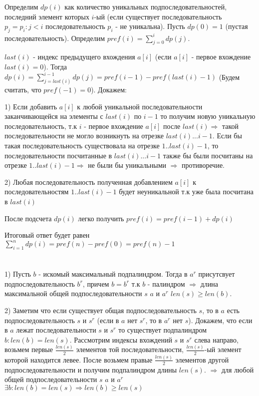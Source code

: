 \documentclass{article}
\begin{document}
\begin{flushleft}
\section{}

Определим $dp(i)$ как количество уникальных подпоследовательностей, последний элемент которых $i$-ый (если существует последовательность $p_j = p_i : j < i$ последовательность $p_i$ - не уникальна). Пусть $dp(0) = 1$ (пустая последовательность). Определим $pref(i) = \sum\limits_{j = 0}^i{dp(j)}$.

 $last(i)$ - индекс предыдущего вхождения $a[i]$ (если $a[i]$ - первое вхождение $last(i) = 0$). Тогда $dp(i) = \sum\limits_{j = last(i)}^{i - 1}{dp(j)} = pref(i - 1) - pref(last(i) - 1)$ (Будем считать, что $pref(-1) = 0$). Докажем: 

1) Если добавить $a[i]$ к любой уникальной последовательности заканчивающейся на элементы с $last(i)$ по $i - 1$ то получим новую уникальную последовательность, т.к $i$ - первое вхождение $a[i]$ после $last(i) \Rightarrow$ такой последовательности не могло возникнуть на отрезке $last(i)... i - 1$. Если бы такая последовательность существовала на отрезке $1.. last(i) - 1$, то последовательности посчитанные в $last(i)... i - 1$ также бы были посчитаны на отрезке $1.. last(i) - 1 \Rightarrow$ не были бы уникальными $\Rightarrow$ противоречие.

2) Любая последовательность полученная добавлением $a[i]$ к последовательностям $1.. last(i) - 1$ будет неуникальной т.к уже была посчитана в $last(i)$

После подсчета $dp(i)$ легко получить $pref(i) = pref(i - 1) + dp(i)$

Итоговый ответ будет равен $\sum\limits_{i = 1}^n{dp(i)} = pref(n) - pref(0) = pref(n) - 1$

\section{}

1) Пусть $b$ - искомый максимальный подпалиндром. Тогда в $a^r$ присутсвует подпоследовательность $b^r$, причем $b = b^r$ т.к $b$ - палиндром $\Rightarrow$ длина максимальной общей подпоследовательности $s$ $a$ и $a^r$ $len(s)\ge len(b)$. 

2) Заметим что если существует общая подпоследовательность $s$, то в $a$ есть подпоследовательность $s$ и $s^r$ (если в $a$ нет $s^r$, то в $a^r$ нет $s$). Докажем, что если в $a$ лежат последовательности $s$ и $s^r$ то существует подпалиндром $b : len(b) = len(s)$. Рассмотрим индексы вхождений $s$ и $s^r$ слева направо, возьмем первые $\frac{len(s)}{2}$ элементов той последовательности, $\frac{len(s)}{2}$-ый элемент которой находится левее. После возьмем правые $\frac{len(s)}{2}$ элементов другой подпоследовательности и получим подпалиндром длины $len(s)$. $\Rightarrow$ для любой общей подпоследовательности $s$ $a$ и $a^r$  $\exists b : len(b) = len(s) \Rightarrow len(b) \ge len(s)$


\end{flushleft}
\end{document}

